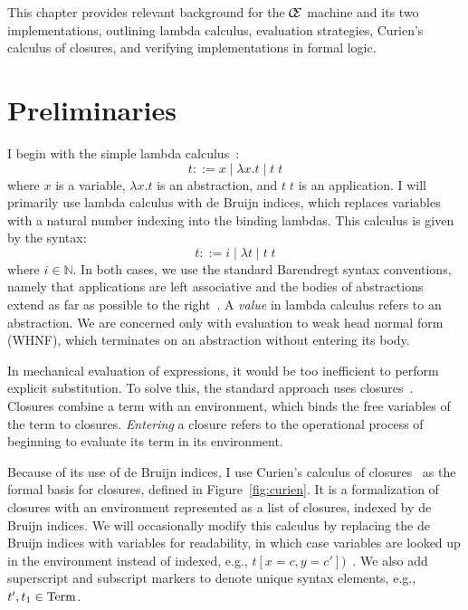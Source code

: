 This chapter provides relevant background for the $\mathcal{\mathcal{C} \mskip
-4mu \mathcal{E}}$ machine and its two implementations, outlining lambda
calculus, evaluation strategies, Curien's calculus of closures, and verifying
implementations in formal logic. 

\section{Preliminaries} \label{sec:prelim}

I begin with the simple lambda calculus~\cite{barendregt1984lambda}:  $$ t::= x
\; | \;  \lambda x.t \; | \;  t \; t $$ where $x$ is a variable, $\lambda x.t$
is an abstraction, and $t \; t$ is an application. I will primarily use lambda
calculus with de Bruijn indices, which replaces variables with a natural number
indexing into the binding lambdas.  This calculus is given by the syntax: $$
t::= i \; | \; \lambda t \; | \; t \; t $$ where $i \in \mathbb{N}$. In both
cases, we use the standard Barendregt syntax conventions, namely that
applications are left associative and the bodies of abstractions extend as far
as possible to the right~\cite{barendregt1984lambda}.  A \emph{value} in lambda
calculus refers to an abstraction. We are concerned only with evaluation to weak
head normal form (WHNF), which terminates on an abstraction without entering its
body.

In mechanical evaluation of expressions, it would be too inefficient to perform
explicit substitution. To solve this, the standard approach uses closures~\cite{landin1964mechanical,curien1991abstract,jonesstg,biernacka2007concrete}.
Closures combine a term with an environment, which binds the free variables of
the term to closures. \emph{Entering} a closure refers to the operational
process of beginning to evaluate its term in its environment.

Because of its use of de Bruijn indices, I use Curien's calculus of
closures~\cite{curien1991abstract} as the formal basis for closures,
defined in Figure~\ref{fig:curien}. It is a formalization of closures with an
environment represented as a list of closures, indexed by de Bruijn indices. We
will occasionally modify this calculus by replacing the de Bruijn indices with
variables for readability, in which case variables are looked up in the
environment instead of indexed, e.g., $t[x = c, y = c'])$~\cite{barendregt1984lambda}. We also add superscript and subscript markers to
denote unique syntax elements, e.g., $t', t_1 \in \textnormal{Term}$. 

